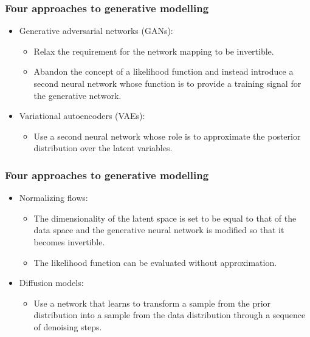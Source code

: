 \documentclass{beamer}
\begin{document}
\begin{frame}
    \frametitle{Four approaches to generative modelling}
    \begin{itemize}
        \item Generative adversarial networks (GANs):
        \begin{itemize}
            \item Relax the requirement for the network mapping to be invertible.
            \item Abandon the concept of a likelihood function and instead introduce a second neural network whose function is to provide a training signal for the generative network.
        \end{itemize}
        \item Variational autoencoders (VAEs):
        \begin{itemize}
            \item Use a second neural network whose role is to approximate the posterior distribution over the latent variables.
        \end{itemize}
    \end{itemize}
\end{frame}

\begin{frame}
    \frametitle{Four approaches to generative modelling}
    \begin{itemize}
        \item Normalizing flows:
        \begin{itemize}
            \item The dimensionality of the latent space is set to be equal to that of the data space and the generative neural network is modified so that it becomes invertible.
            \item The likelihood function can be evaluated without approximation.
        \end{itemize}
        \item Diffusion models:
        \begin{itemize}
            \item Use a network that learns to transform a sample from the prior distribution into a sample from the data distribution through a sequence of denoising steps.
        \end{itemize}
    \end{itemize}
\end{frame}
\end{document}
